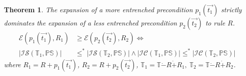\documentclass[11pt,letterpaper]{article}
\newtheorem{theorem}{Theorem}[section]
\newcommand{\theory}{\mathbb{T}}
\begin{document}
\begin{theorem}\label{the:def:precE2}
The expansion of a more entrenched precondition $p_1(\vec{t_1})$ strictly dominates the expansion of a less entrenched precondition $p_2(\vec{t_2})$ to rule $R$.
\begin{align*}
    \mathcal{E}(p_1(\vec{t_1}), R_1) &\geq\mathcal{E}(p_2(\vec{t_2}), R_2) \iff   \\
    |\mathcal{IS}(\theory_1, \mathbb{PS}) | & \leq^*  |\mathcal{IS}(\theory_2, \mathbb{PS})|\wedge
   |\mathcal{IC}(\theory_1, \mathbb{PS})| \leq^* |\mathcal{IC}(\theory_2, \mathbb{PS})|
\end{align*}
where  $R_1 = R+p_1(\vec{t_1})$, $R_2 = R+p_2(\vec{t_2})$, $\theory_1 = \theory \dot{-} R \dot{+} R_1,\ \theory_2 = \theory \dot{-} R \dot{+} R_2 $.
\end{theorem}
\end{document}
